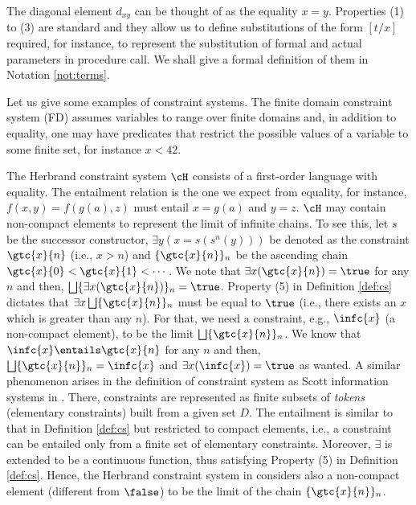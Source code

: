 \documentclass{tlp}
\begin{document}
 
 The diagonal element $d_{xy}$ can be thought of as the equality $x=y$. Properties (1) to (3) are standard and  they allow us to define  substitutions of the form $[t/x]$  required, for instance, to represent the substitution of formal and actual parameters in procedure call. We shall give a formal definition of them in Notation \ref{not:terms}. 



  Let us give some examples of constraint systems.  The finite domain constraint system  (FD) \cite{HentenryckSD98} assumes variables to range over finite domains and, in addition to equality, one may have predicates  that restrict the possible values of a variable to some finite set, for instance $x<42$. 

The Herbrand constraint system  $\cH$ consists of a first-order language with equality. 
The entailment relation is the one we expect from equality, for instance, $f(x,y) = f(g(a),z)$ must entail $x=g(a)$ and $y=z$. 
 $\cH$ may contain non-compact elements to represent the limit of infinite chains. To see this, let $s$ be the successor constructor,  $ \exists y (x = s(s^n(y)))$ be denoted as the constraint  $\gtc{x}{n}$ (i.e., $x>n$) and  $\{ \gtc{x}{n}\}_n$ be the ascending chain  $\gtc{x}{0} < \gtc{x}{1} < \cdots$. We note that $\exists x (\gtc{x}{n})  =  \true$ for any $n$ and then,  $\bigsqcup  \{ \exists x (\gtc{x}{n}) \}_n = \true$. 
Property (5) in Definition \ref{def:cs} dictates that 
$\exists x \bigsqcup \{\gtc{x}{n}\}_n$ must be equal to $\true$ (i.e., there exists an $x$ which is greater than any $n$). For that,  we need a constraint, e.g.,  $\infc{x}$ (a non-compact element), to be the limit $\bigsqcup \{\gtc{x}{n}\}_n$. We know that    $\infc{x} \entails \gtc{x}{n}$ for any $n$
and then,  $\bigsqcup \{\gtc{x}{n}\}_n=\infc{x}$ and $\exists x( \infc{x}) = \true$ as wanted.
A similar phenomenon arises  in the definition of constraint system   as Scott information systems in \cite{SRP91}. There,  constraints are represented as finite subsets of \emph{tokens} (elementary constraints) built from a given set $D$. The entailment  is similar to that  in Definition \ref{def:cs} but   restricted to compact elements, i.e.,  a constraint can be entailed only from a finite set of elementary constraints. Moreover, $\exists$   is extended to  be a continuous  function,  thus satisfying  Property (5) in Definition \ref{def:cs}. Hence, the  Herbrand constraint system in  \cite{SRP91}  considers also a non-compact element (different from $\false$)  to be the   limit of the chain $\{\gtc{x}{n}\}_n$.
\end{document}
